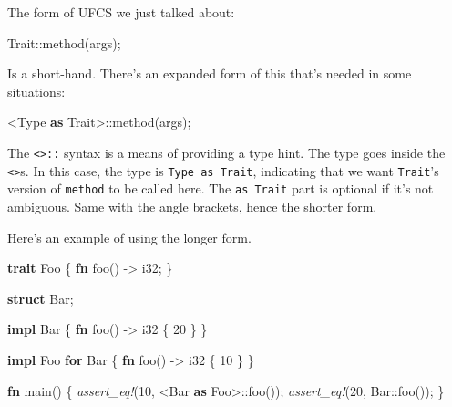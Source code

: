 \documentclass[a4paper,]{book}
\newenvironment{Shaded}{\begin{snugshade}}{\end{snugshade}}
\newcommand{\KeywordTok}[1]{\textcolor[rgb]{0.13,0.29,0.53}{\textbf{{#1}}}}
\newcommand{\DataTypeTok}[1]{\textcolor[rgb]{0.13,0.29,0.53}{{#1}}}
\newcommand{\DecValTok}[1]{\textcolor[rgb]{0.00,0.00,0.81}{{#1}}}
\newcommand{\PreprocessorTok}[1]{\textcolor[rgb]{0.56,0.35,0.01}{\textit{{#1}}}}
\newcommand{\NormalTok}[1]{{#1}}
\begin{document}
The form of UFCS we just talked about:

\begin{Shaded}
\begin{Highlighting}[]
\NormalTok{Trait::method(args);}
\end{Highlighting}
\end{Shaded}

Is a short-hand. There's an expanded form of this that's needed in some
situations:

\begin{Shaded}
\begin{Highlighting}[]
\NormalTok{<Type }\KeywordTok{as} \NormalTok{Trait>::method(args);}
\end{Highlighting}
\end{Shaded}

The \texttt{\textless{}\textgreater{}::} syntax is a means of providing
a type hint. The type goes inside the
\texttt{\textless{}\textgreater{}}s. In this case, the type is
\texttt{Type\ as\ Trait}, indicating that we want \texttt{Trait}'s
version of \texttt{method} to be called here. The \texttt{as\ Trait}
part is optional if it's not ambiguous. Same with the angle brackets,
hence the shorter form.

Here's an example of using the longer form.

\begin{Shaded}
\begin{Highlighting}[]
\KeywordTok{trait} \NormalTok{Foo \{}
    \KeywordTok{fn} \NormalTok{foo() -> }\DataTypeTok{i32}\NormalTok{;}
\NormalTok{\}}

\KeywordTok{struct} \NormalTok{Bar;}

\KeywordTok{impl} \NormalTok{Bar \{}
    \KeywordTok{fn} \NormalTok{foo() -> }\DataTypeTok{i32} \NormalTok{\{}
        \DecValTok{20}
    \NormalTok{\}}
\NormalTok{\}}

\KeywordTok{impl} \NormalTok{Foo }\KeywordTok{for} \NormalTok{Bar \{}
    \KeywordTok{fn} \NormalTok{foo() -> }\DataTypeTok{i32} \NormalTok{\{}
        \DecValTok{10}
    \NormalTok{\}}
\NormalTok{\}}

\KeywordTok{fn} \NormalTok{main() \{}
    \PreprocessorTok{assert_eq!}\NormalTok{(}\DecValTok{10}\NormalTok{, <Bar }\KeywordTok{as} \NormalTok{Foo>::foo());}
    \PreprocessorTok{assert_eq!}\NormalTok{(}\DecValTok{20}\NormalTok{, Bar::foo());}
\NormalTok{\}}
\end{Highlighting}
\end{Shaded}
\end{document}

